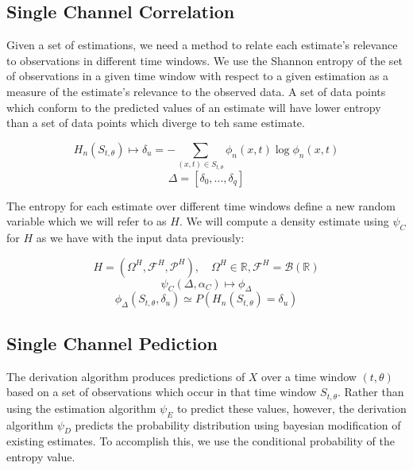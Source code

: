 \documentclass[10pt]{article}
\begin{document}
\subsection{Single Channel Correlation}


Given a set of estimations, we need a method to relate each estimate's relevance to observations in different time windows.  We use the Shannon entropy of the set of observations in a given time window with respect to a given estimation as a measure of the estimate's relevance to the observed data.  A set of data points which conform to the predicted values of an estimate will have lower entropy than a set of data points which diverge to teh same estimate.

\begin{equation} H_n( S_{t,\theta} ) \mapsto \delta_u = -\sum_{(x,t) \in S_{t,\theta}} \phi_n(x,t) \log \phi_n(x,t) \end{equation}
\[ \Delta = [\delta_0,...,\delta_q] \]

The entropy for each estimate over different time windows define a new random variable which we will refer to as \( H \).  We will compute a density estimate using \(\psi_C \) for \( H \) as we have with the input data previously:

\[ H = ( \Omega^H, \mathcal{F}^H, \mathcal{P}^H ), \quad \Omega^H \in \mathbb{R}, \mathcal{F}^H = \mathcal{B}(\mathbb{R}) \]
\begin{equation} \psi_C( \Delta , \alpha_C ) \mapsto \phi_\Delta \end{equation}
\begin{equation} \phi_\Delta(S_{t,\theta},\delta_u) \simeq P \left( H_n(S_{t,\theta}) = \delta_u \right)
\end{equation}

\subsection{Single Channel Pediction}
The derivation algorithm produces predictions of \(X \) over a time window \( (t,\theta) \) based on a set of observations which occur in that time window \(S_{t,\theta} \).  Rather than using the estimation algorithm \(\psi_E \) to predict these values, however, the derivation algorithm \(\psi_D \) predicts the probability distribution  using bayesian modification of existing estimates.  To accomplish this, we use the conditional probability of the entropy value.
\end{document}
